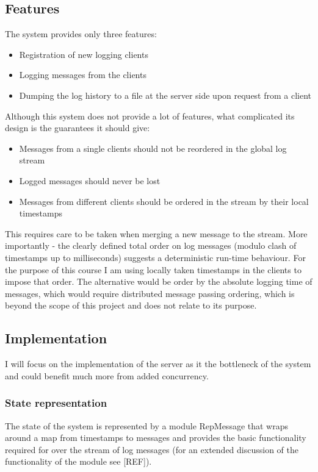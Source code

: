 \documentclass[12pt,twoside,notitlepage]{report}
\begin{document}
\subsection{Features}
The system provides only three features:
\begin{itemize}
\item
Registration of new logging clients
\item
Logging messages from the clients
\item
Dumping the log history to a file at the server side upon request from a client
\end{itemize}

Although this system does not provide a lot of features, what complicated its design is the guarantees it should give:
\begin{itemize}
\item
Messages from a single clients should not be reordered in the global log stream
\item
Logged messages should never be lost
\item
Messages from different clients should be ordered in the stream by their local timestamps
\end{itemize}

This requires care to be taken when merging a new message to the stream. More importantly - the clearly defined total order on log messages (modulo clash of timestamps up to milliseconds) suggests a deterministic run-time behaviour.
For the purpose of this course I am using locally taken timestamps in the clients to impose that order. The alternative would be order by the absolute logging time of messages, which would require distributed message passing ordering, which is beyond the scope of this project and does not relate to its purpose. 

\subsection{Implementation}
I will focus on the implementation of the server as it the bottleneck of the system and could benefit much more from added concurrency.

\subsubsection{State representation}
The state of the system is represented by a module {RepMessage} that wraps around a map from timestamps to messages and provides the basic functionality required for over the stream of log messages (for an extended discussion of the functionality of the module see [REF]). 
\end{document}
